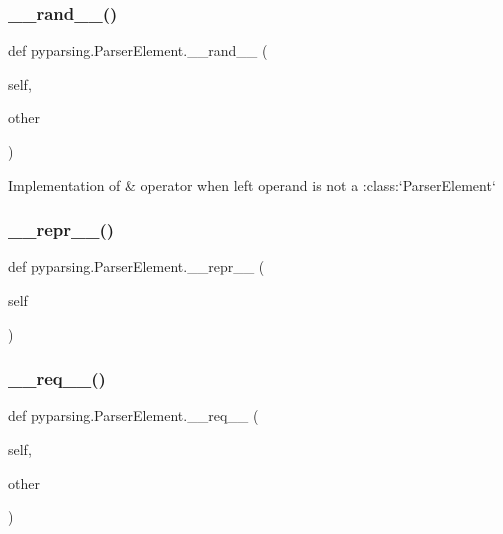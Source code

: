 \subsubsection{\texorpdfstring{\+\_\+\+\_\+rand\+\_\+\+\_\+()}{\_\_rand\_\_()}}
{\footnotesize\ttfamily def pyparsing.\+Parser\+Element.\+\_\+\+\_\+rand\+\_\+\+\_\+ (\begin{DoxyParamCaption}\item[{}]{self,  }\item[{}]{other }\end{DoxyParamCaption})}

\begin{DoxyVerb}Implementation of & operator when left operand is not a :class:`ParserElement`
\end{DoxyVerb}
 \mbox{\label{classpyparsing_1_1ParserElement_a299291d78f90aae57bb292bba93f41cf}} 
\subsubsection{\texorpdfstring{\+\_\+\+\_\+repr\+\_\+\+\_\+()}{\_\_repr\_\_()}}
{\footnotesize\ttfamily def pyparsing.\+Parser\+Element.\+\_\+\+\_\+repr\+\_\+\+\_\+ (\begin{DoxyParamCaption}\item[{}]{self }\end{DoxyParamCaption})}

\mbox{\label{classpyparsing_1_1ParserElement_a268f1bf51db4445eb7821d8ce259bc4b}} 
\subsubsection{\texorpdfstring{\+\_\+\+\_\+req\+\_\+\+\_\+()}{\_\_req\_\_()}}
{\footnotesize\ttfamily def pyparsing.\+Parser\+Element.\+\_\+\+\_\+req\+\_\+\+\_\+ (\begin{DoxyParamCaption}\item[{}]{self,  }\item[{}]{other }\end{DoxyParamCaption})}

